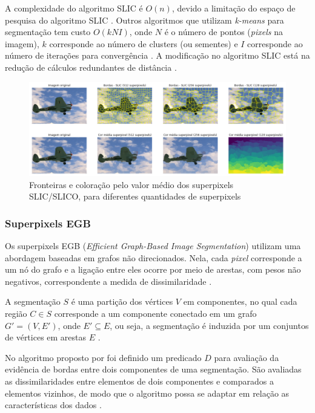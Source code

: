 \begin{document}
A complexidade do algoritmo SLIC é $O(n)$, devido a limitação do espaço de pesquisa do algoritmo SLIC \cite{SLIC1}. Outros algoritmos que utilizam \textit{k-means} para segmentação tem custo $O(kNI)$, onde $N$ é o número de pontos (\textit{pixels} na imagem), $k$ corresponde ao número de clusters (ou sementes) e $I$ corresponde ao número de iterações para convergência \cite{SLIC1}. A modificação no algoritmo SLIC está na redução de cálculos redundantes de distância \cite{SLIC1}. 

\begin{figure}[ht]
\centering
\includegraphics[width=1.\textwidth]{slic_segmentation_compare.png}
\caption{Fronteiras e coloração pelo valor médio dos superpixels SLIC/SLICO, para diferentes quantidades de superpixels}
\label{fig:SLICO}
\end{figure}


\subsubsection{Superpixels EGB} \label{sssec:egb}

Os superpixels EGB (\textit{Efficient Graph-Based Image Segmentation}) utilizam uma abordagem baseadas em grafos não direcionados. Nela, cada \textit{pixel} corresponde a um nó do grafo e a ligação entre eles ocorre por meio de arestas, com pesos não negativos, correspondente a medida de dissimilaridade \cite{FELZENSZWALB}. 

A segmentação $S$ é uma partição dos vértices $V$ em componentes, no qual cada região $C \in S$ corresponde a um componente conectado em um grafo $G'=(V,E')$, onde $E' \subseteq E$, ou seja, a segmentação é induzida por um conjuntos de vértices em arestas $E$ \cite{FELZENSZWALB}.

No algoritmo proposto por \cite{FELZENSZWALB} foi definido um predicado $D$ para avaliação da evidência de bordas entre dois componentes de uma segmentação. São avaliadas as dissimilaridades entre elementos de dois componentes e comparados a elementos vizinhos, de modo que o algoritmo possa se adaptar em relação as características dos dados \cite{FELZENSZWALB}. 
\end{document}
